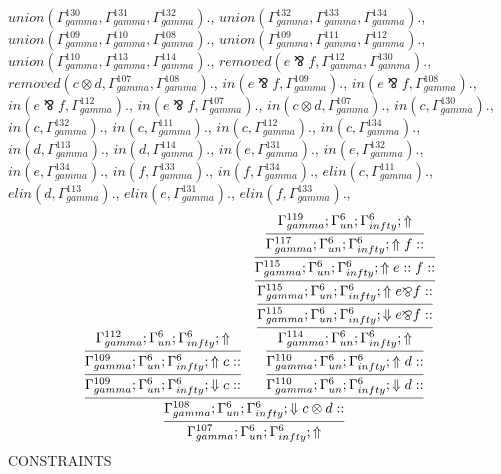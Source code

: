 \documentclass[a4paper, 11pt]{article}
\begin{document}
$union(\Gamma_{gamma}^{130}, \Gamma_{gamma}^{131}, \Gamma_{gamma}^{132}).$, $union(\Gamma_{gamma}^{132}, \Gamma_{gamma}^{133}, \Gamma_{gamma}^{134}).$, $union(\Gamma_{gamma}^{109}, \Gamma_{gamma}^{110}, \Gamma_{gamma}^{108}).$, $union(\Gamma_{gamma}^{109}, \Gamma_{gamma}^{111}, \Gamma_{gamma}^{112}).$, $union(\Gamma_{gamma}^{110}, \Gamma_{gamma}^{113}, \Gamma_{gamma}^{114}).$, $removed(e \bindnasrepma f, \Gamma_{gamma}^{112}, \Gamma_{gamma}^{130}).$, $removed(c \otimes d, \Gamma_{gamma}^{107}, \Gamma_{gamma}^{108}).$, $in(e \bindnasrepma f, \Gamma_{gamma}^{109}).$, $in(e \bindnasrepma f, \Gamma_{gamma}^{108}).$, $in(e \bindnasrepma f, \Gamma_{gamma}^{112}).$, $in(e \bindnasrepma f, \Gamma_{gamma}^{107}).$, $in(c \otimes d, \Gamma_{gamma}^{107}).$, $in(c, \Gamma_{gamma}^{130}).$, $in(c, \Gamma_{gamma}^{132}).$, $in(c, \Gamma_{gamma}^{111}).$, $in(c, \Gamma_{gamma}^{112}).$, $in(c, \Gamma_{gamma}^{134}).$, $in(d, \Gamma_{gamma}^{113}).$, $in(d, \Gamma_{gamma}^{114}).$, $in(e, \Gamma_{gamma}^{131}).$, $in(e, \Gamma_{gamma}^{132}).$, $in(e, \Gamma_{gamma}^{134}).$, $in(f, \Gamma_{gamma}^{133}).$, $in(f, \Gamma_{gamma}^{134}).$, $elin(c, \Gamma_{gamma}^{111}).$, $elin(d, \Gamma_{gamma}^{113}).$, $elin(e, \Gamma_{gamma}^{131}).$, $elin(f, \Gamma_{gamma}^{133}).$, 
{\small
\[
\infer{\Gamma_{ gamma}^{107} ; \Gamma_{un}^{6} ; \Gamma_{ infty}^{6} ;  \Uparrow }
{\infer{\Gamma_{ gamma}^{108} ; \Gamma_{un}^{6} ; \Gamma_{ infty}^{6} ;  \Downarrow c \otimes d :: }
{\infer{\Gamma_{ gamma}^{109} ; \Gamma_{un}^{6} ; \Gamma_{ infty}^{6} ;  \Downarrow c :: }
{\infer{\Gamma_{ gamma}^{109} ; \Gamma_{un}^{6} ; \Gamma_{ infty}^{6} ;  \Uparrow c :: }
{\Gamma_{ gamma}^{112} ; \Gamma_{un}^{6} ; \Gamma_{ infty}^{6} ;  \Uparrow }}
&
\infer{\Gamma_{ gamma}^{110} ; \Gamma_{un}^{6} ; \Gamma_{ infty}^{6} ;  \Downarrow d :: }
{\infer{\Gamma_{ gamma}^{110} ; \Gamma_{un}^{6} ; \Gamma_{ infty}^{6} ;  \Uparrow d :: }
{\infer{\Gamma_{ gamma}^{114} ; \Gamma_{un}^{6} ; \Gamma_{ infty}^{6} ;  \Uparrow }
{\infer{\Gamma_{ gamma}^{115} ; \Gamma_{un}^{6} ; \Gamma_{ infty}^{6} ;  \Downarrow e \bindnasrepma f :: }
{\infer{\Gamma_{ gamma}^{115} ; \Gamma_{un}^{6} ; \Gamma_{ infty}^{6} ;  \Uparrow e \bindnasrepma f :: }
{\infer{\Gamma_{ gamma}^{115} ; \Gamma_{un}^{6} ; \Gamma_{ infty}^{6} ;  \Uparrow e :: f :: }
{\infer{\Gamma_{ gamma}^{117} ; \Gamma_{un}^{6} ; \Gamma_{ infty}^{6} ;  \Uparrow f :: }
{\Gamma_{ gamma}^{119} ; \Gamma_{un}^{6} ; \Gamma_{ infty}^{6} ;  \Uparrow }}}}}}}}}
\]
}
CONSTRAINTS
\end{document}
